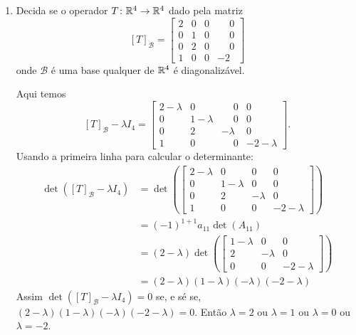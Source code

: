 \begin{exemplo}
\begin{enumerate}[label={\arabic*})]
        \item Decida se o operador $T \colon \mathbb{R}^4 \to \mathbb{R}^4$ dado pela matriz
            \[
                [T]_\mathcal{B} = \begin{bmatrix}2 & 0 & 0 &\phantom{-}0\\0 & 1 & 0 & \phantom{-}0\\0 & 2 & 0 & \phantom{-}0\\
                1 & 0 & 0 & -2\end{bmatrix}
            \]
            onde $\mathcal{B}$ é uma base qualquer de $\mathbb{R}^4$ é diagonalizável.
            \begin{solucao}
                Aqui temos
                \[
                    [T]_\mathcal{B} - \lambda I_4 = \begin{bmatrix}2 - \lambda & 0 & \phantom{-}0 & 0\\0 & 1 - \lambda &
                    \phantom{-}0 & 0\\0 & 2 & -\lambda & 0\\1 & 0 & \phantom{-}0 & -2 - \lambda\end{bmatrix}.
                \]
                Usando a primeira linha para calcular o determinante:
                \begin{align*}
                    \det([T]_\mathcal{B} - \lambda I_4) &= \det\left(\begin{bmatrix}2 - \lambda & 0 & 0 & 0\\0 & 1 - \lambda & 0 & 0\\
                        0 & 2 & -\lambda & 0\\1 & 0 & 0 & -2 - \lambda\end{bmatrix}\right) \\ &= (-1)^{1 + 1}a_{11}\det(A_{11}) \\ &=
                            (2 - \lambda)\det\left(\begin{bmatrix}1 - \lambda & 0 & 0\\2 & -\lambda & 0\\0 & 0 & -2 -
                            \lambda\end{bmatrix}\right) \\ &= (2 - \lambda)(1 - \lambda)(-\lambda)(-2 - \lambda)
                \end{align*}
                Assim $\det([T]_\mathcal{B} - \lambda I_4) = 0$ se, e sé se, $(2 - \lambda)(1 - \lambda)(-\lambda)(-2 - \lambda) = 0$.
                Então $\lambda = 2$ ou $\lambda = 1$ ou $\lambda = 0$ ou $\lambda = -2$.


\end{solucao}
\end{enumerate}
\end{exemplo}
